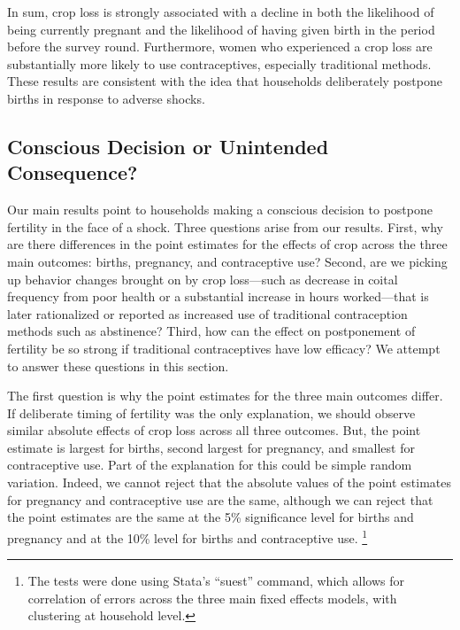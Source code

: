 \documentclass[letterpaper,12pt]{article}
\begin{document}
In sum, crop loss is strongly associated with a decline in
both the likelihood of being currently pregnant and the likelihood
of having given birth in the period before the survey round.
Furthermore, women who experienced a crop loss are substantially
more likely to use contraceptives, especially traditional methods.
These results are consistent with the idea that households 
deliberately postpone births in response to adverse shocks.

\subsection{Conscious Decision or Unintended Consequence?}

Our main results point to households making a conscious decision
to postpone fertility in the face of a shock.
Three questions arise from our results.
First, 
why are there differences in the point estimates for
the effects of crop across the three main outcomes: 
births, pregnancy, and contraceptive use?
Second, 
are we picking up behavior changes brought on by
crop loss---such as decrease in coital frequency from poor
health or a substantial increase in hours worked---that is later 
rationalized or reported as increased use of traditional 
contraception methods such as abstinence?
Third, 
how can the effect on postponement of fertility be so
strong if traditional contraceptives have low efficacy?
We attempt to answer these questions in this section.

The first question is why the point estimates for the three main 
outcomes differ.
If deliberate timing of fertility was the only explanation, 
we should observe similar absolute effects of crop loss across all three outcomes.
But, the point estimate is largest for births, second largest for pregnancy, 
and smallest for contraceptive use.
Part of the explanation for this could be simple random variation.
Indeed, we cannot reject that the absolute values of the point 
estimates for pregnancy and contraceptive use are the same, 
although we can reject that the point estimates are the same
at the 5\% significance level for births and pregnancy and at
the 10\% level for births and contraceptive use.%
\footnote{
The tests were done using Stata's ``suest'' command, which allows for correlation 
of errors across the three main fixed effects models,  with clustering at
household level. 
}
\end{document}
